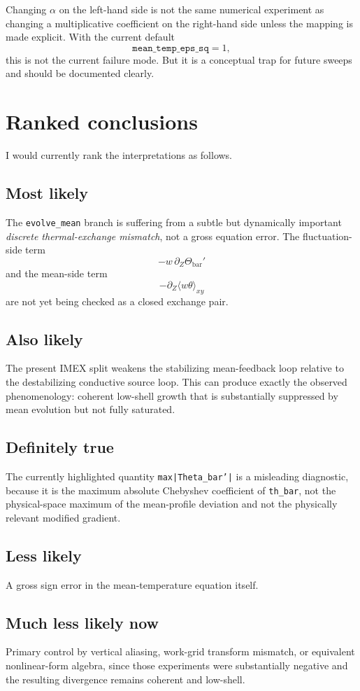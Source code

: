 \documentclass[11pt]{article}
\begin{document}
Changing $\alpha$ on the left-hand side is not the same numerical experiment as changing a multiplicative coefficient on the right-hand side unless the mapping is made explicit. With the current default
\[
\texttt{mean\_temp\_eps\_sq}=1,
\]
this is not the current failure mode. But it is a conceptual trap for future sweeps and should be documented clearly.

\section{Ranked conclusions}

I would currently rank the interpretations as follows.

\subsection*{Most likely}
The \texttt{evolve\_mean} branch is suffering from a subtle but dynamically important \emph{discrete thermal-exchange mismatch}, not a gross equation error. The fluctuation-side term
\[
-w\,\partial_Z\Theta_{\mathrm{bar}}'
\]
and the mean-side term
\[
-\partial_Z\langle w\theta\rangle_{xy}
\]
are not yet being checked as a closed exchange pair.

\subsection*{Also likely}
The present IMEX split weakens the stabilizing mean-feedback loop relative to the destabilizing conductive source loop. This can produce exactly the observed phenomenology: coherent low-shell growth that is substantially suppressed by mean evolution but not fully saturated.

\subsection*{Definitely true}
The currently highlighted quantity \texttt{max|Theta\_bar'|} is a misleading diagnostic, because it is the maximum absolute Chebyshev coefficient of \texttt{th\_bar}, not the physical-space maximum of the mean-profile deviation and not the physically relevant modified gradient.

\subsection*{Less likely}
A gross sign error in the mean-temperature equation itself.

\subsection*{Much less likely now}
Primary control by vertical aliasing, work-grid transform mismatch, or equivalent nonlinear-form algebra, since those experiments were substantially negative and the resulting divergence remains coherent and low-shell.
\end{document}
